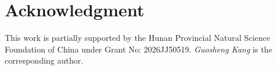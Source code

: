 \documentclass[conference]{IEEEtran}
\begin{document}

\section*{Acknowledgment}

This work is partially supported by the Hunan Provincial Natural Science
Foundation of China under Grant No: 2026JJ50519.
\textit{Guosheng Kang} is the corresponding author.





\end{document}
